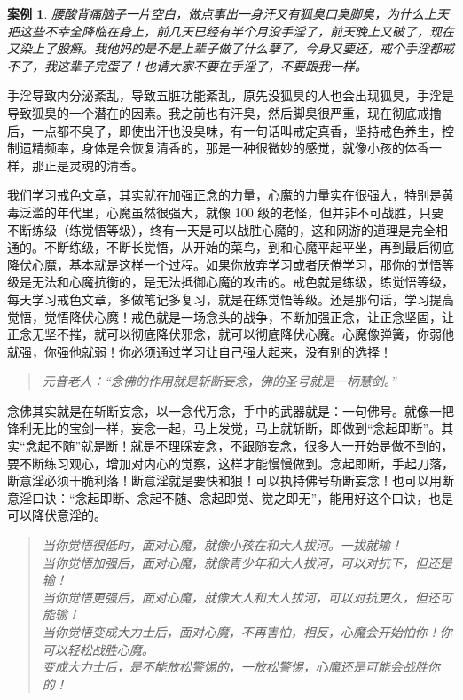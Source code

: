 \documentclass{ctexart}
\newtheorem{case}{案例}
\begin{document}
\begin{case}
    腰酸背痛脑子一片空白，做点事出一身汗又有狐臭口臭脚臭，为什么上天把这些不幸全降临在身上，前几天已经有半个月没手淫了，前天晚上又破了，现在又染上了股癣。我他妈的是不是上辈子做了什么孽了，今身又要还，戒个手淫都戒不了，我这辈子完蛋了！也请大家不要在手淫了，不要跟我一样。
\end{case}

手淫导致内分泌紊乱，导致五脏功能紊乱，原先没狐臭的人也会出现狐臭，手淫是导致狐臭的一个潜在的因素。我之前也有汗臭，然后脚臭很严重，现在彻底戒撸后，一点都不臭了，即使出汗也没臭味，有一句话叫戒定真香，坚持戒色养生，控制遗精频率，身体是会恢复清香的，那是一种很微妙的感觉，就像小孩的体香一样，那正是灵魂的清香。

我们学习戒色文章，其实就在加强正念的力量，心魔的力量实在很强大，特别是黄毒泛滥的年代里，心魔虽然很强大，就像 100 级的老怪，但并非不可战胜，只要不断练级（练觉悟等级），终有一天是可以战胜心魔的，这和网游的道理是完全相通的。不断练级，不断长觉悟，从开始的菜鸟，到和心魔平起平坐，再到最后彻底降伏心魔，基本就是这样一个过程。如果你放弃学习或者厌倦学习，那你的觉悟等级是无法和心魔抗衡的，是无法抵御心魔的攻击的。戒色就是练级，练觉悟等级，每天学习戒色文章，多做笔记多复习，就是在练觉悟等级。还是那句话，学习提高觉悟，觉悟降伏心魔！戒色就是一场念头的战争，不断加强正念，让正念坚固，让正念无坚不摧，就可以彻底降伏邪念，就可以彻底降伏心魔。心魔像弹簧，你弱他就强，你强他就弱！你必须通过学习让自己强大起来，没有别的选择！

\begin{quote}\it
    元音老人：“念佛的作用就是斩断妄念，佛的圣号就是一柄慧剑。”
\end{quote}

念佛其实就是在斩断妄念，以一念代万念，手中的武器就是：一句佛号。就像一把锋利无比的宝剑一样，妄念一起，马上发觉，马上就斩断，即做到“念起即断”。其实“念起不随”就是断！就是不理睬妄念，不跟随妄念，很多人一开始是做不到的，要不断练习观心，增加对内心的觉察，这样才能慢慢做到。念起即断，手起刀落，断意淫必须干脆利落！断意淫就是要快和狠！可以执持佛号斩断妄念！也可以用断意淫口诀：“念起即断、念起不随、念起即觉、觉之即无”，能用好这个口诀，也是可以降伏意淫的。

\begin{quotation}\it
    当你觉悟很低时，面对心魔，就像小孩在和大人拔河。一拔就输！\\
    当你觉悟加强后，面对心魔，就像青少年和大人拔河，可以对抗下，但还是输！\\
    当你觉悟更强后，面对心魔，就像大人和大人拔河，可以对抗更久，但还可能输！\\
    当你觉悟变成大力士后，面对心魔，不再害怕，相反，心魔会开始怕你！你可以轻松战胜心魔。\\
    变成大力士后，是不能放松警惕的，一放松警惕，心魔还是可能会战胜你的！
\end{quotation}
\end{document}
